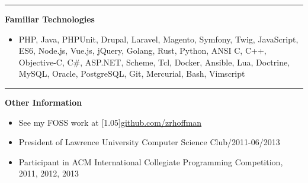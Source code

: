 \documentclass[letterpaper, 11pt]{article}
\newcommand{\resumetitle}[1]{
    \flushleft\textbf{#1}
}
\newcommand{\dotnormalline}[2]{#1\dotfill#2}
\begin{document}
\hrule\vspace{0.3cm}

{
    \resumetitle{Familiar Technologies}\vspace{-0.05cm}
    \begin{itemize}[label={}]
        \item PHP, Java, PHPUnit, Drupal, Laravel, Magento, Symfony, Twig, JavaScript, ES6, Node.js, Vue.js, jQuery, Golang, Rust, Python, ANSI C, C++, Objective-C, C\#, ASP.NET, Scheme, Tcl, Docker, Ansible, Lua, Doctrine, MySQL, Oracle, PostgreSQL, Git, Mercurial, Bash, Vimscript
    \end{itemize}
}

\hrule\vspace{0.3cm}

\resumetitle{Other Information}
\begin{itemize}
    \item See my FOSS work at \scalebox{1.05}[1.05]{\large{\href{https://github.com/zrhoffman}{\textsf{github.com/zrhoffman}}}}\normalsize
    \item \dotnormalline{President of Lawrence University Computer Science Club}{01/2011-06/2013}
    \item \dotnormalline{Participant in ACM International Collegiate Programming Competition}{2010, 2011, 2012, 2013}
\end{itemize}
\end{document}

